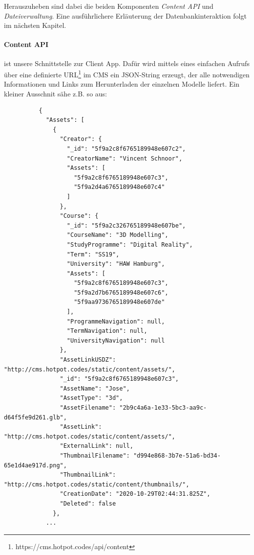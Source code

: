 \documentclass[titlepage, a4paper, 11pt]{scrartcl}
\begin{document}
        Herauszuheben sind dabei die beiden Komponenten \textit{Content API} und \textit{Dateiverwaltung}. 
        Eine ausführlichere Erläuterung der Datenbankinteraktion folgt im nächsten Kapitel.

        \paragraph{Content API} ist unsere Schnittstelle zur Client App. Dafür wird mittels eines einfachen Aufrufs über eine definierte URL\footnote{https://cms.hotpot.codes/api/content}
        im CMS ein JSON-String erzeugt, der alle notwendigen Informationen und Links zum Herunterladen der einzelnen Modelle liefert. Ein kleiner Ausschnit sähe z.B. so aus:

        \begin{lstlisting}          
          {
            "Assets": [
              {
                "Creator": {
                  "_id": "5f9a2c8f6765189948e607c2",
                  "CreatorName": "Vincent Schnoor",
                  "Assets": [
                    "5f9a2c8f6765189948e607c3",
                    "5f9a2d4a6765189948e607c4"
                  ]
                },
                "Course": {
                  "_id": "5f9a2c326765189948e607be",
                  "CourseName": "3D Modelling",
                  "StudyProgramme": "Digital Reality",
                  "Term": "SS19",
                  "University": "HAW Hamburg",
                  "Assets": [
                    "5f9a2c8f6765189948e607c3",
                    "5f9a2d7b6765189948e607c6",
                    "5f9aa9736765189948e607de"
                  ],
                  "ProgrammeNavigation": null,
                  "TermNavigation": null,
                  "UniversityNavigation": null
                },
                "AssetLinkUSDZ": "http://cms.hotpot.codes/static/content/assets/",
                "_id": "5f9a2c8f6765189948e607c3",
                "AssetName": "Jose",
                "AssetType": "3d",
                "AssetFilename": "2b9c4a6a-1e33-5bc3-aa9c-d64f5fe9d261.glb",
                "AssetLink": "http://cms.hotpot.codes/static/content/assets/",
                "ExternalLink": null,
                "ThumbnailFilename": "d994e868-3b7e-51a6-bd34-65e1d4ae917d.png",
                "ThumbnailLink": "http://cms.hotpot.codes/static/content/thumbnails/",
                "CreationDate": "2020-10-29T02:44:31.825Z",
                "Deleted": false
              },
            ...
        \end{lstlisting}    
        
\end{document}
